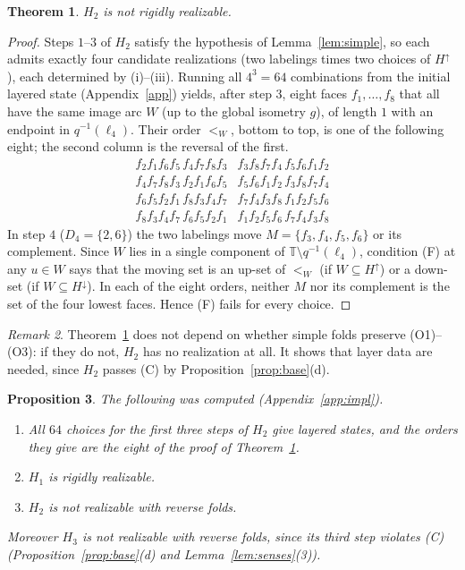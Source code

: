 \documentclass[11pt]{amsart}
\newtheorem{theorem}{Theorem}[section]
\newtheorem{proposition}[theorem]{Proposition}
\theoremstyle{definition}
\theoremstyle{remark}
\newtheorem{remark}[theorem]{Remark}
\newcommand{\T}{\mathbb{T}}
\newcommand{\up}{H^{\uparrow}}
\newcommand{\down}{H^{\downarrow}}
\begin{document}
\begin{theorem}\label{thm:main}
$H_2$ is not rigidly realizable.
\end{theorem}
\begin{proof}
Steps $1$--$3$ of $H_2$ satisfy the hypothesis of Lemma~\ref{lem:simple}, so each admits exactly
four candidate realizations (two labelings times two choices of $\up$), each determined by
(i)--(iii). Running all $4^3=64$ combinations from the initial layered state (Appendix~\ref{app})
yields, after step $3$, eight faces $f_1,\dots,f_8$ that all have the same image arc $W$
(up to the global isometry $g$), of length $1$ with an endpoint in $q^{-1}(\ell_4)$. Their order $<_W$, bottom to top, is one of
the following eight; the second column is the reversal of the first.
\[
\begin{array}{ll}
f_2f_1f_6f_5\,f_4f_7f_8f_3 & f_3f_8f_7f_4\,f_5f_6f_1f_2\\
f_4f_7f_8f_3\,f_2f_1f_6f_5 & f_5f_6f_1f_2\,f_3f_8f_7f_4\\
f_6f_5f_2f_1\,f_8f_3f_4f_7 & f_7f_4f_3f_8\,f_1f_2f_5f_6\\
f_8f_3f_4f_7\,f_6f_5f_2f_1 & f_1f_2f_5f_6\,f_7f_4f_3f_8
\end{array}
\]
In step $4$ ($D_4=\{2,6\}$) the two labelings move $M=\{f_3,f_4,f_5,f_6\}$ or its complement.
Since $W$ lies in a single component of $\T\setminus q^{-1}(\ell_4)$, condition (F) at any
$u\in W$ says that the moving set is an up-set of $<_W$ (if $W\subseteq\up$) or a down-set
(if $W\subseteq\down$). In each of the eight orders, neither $M$ nor its complement is the set of
the four lowest faces. Hence (F) fails for every choice.
\end{proof}

\begin{remark}
Theorem~\ref{thm:main} does not depend on whether simple folds preserve (O1)--(O3): if they do
not, $H_2$ has no realization at all. It shows that layer data are needed, since $H_2$ passes
(C) by Proposition~\ref{prop:base}(d).
\end{remark}

\begin{proposition}\label{prop:computed}
The following was computed (Appendix~\ref{app:impl}).
\begin{enumerate}[label=(\alph*)]
\item All $64$ choices for the first three steps of $H_2$ give layered states, and the orders they
give are the eight of the proof of Theorem~\ref{thm:main}.
\item $H_1$ is rigidly realizable.
\item $H_2$ is not realizable with reverse folds.
\end{enumerate}
Moreover $H_3$ is not realizable with reverse folds, since its third step violates (C)
(Proposition~\ref{prop:base}(d) and Lemma~\ref{lem:senses}(3)).
\end{proposition}
\end{document}
